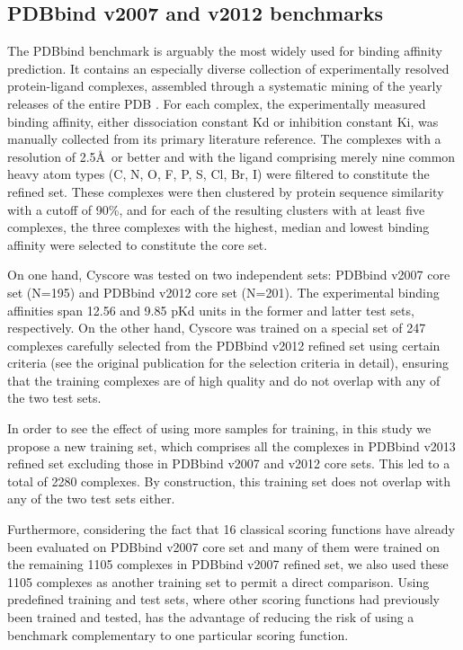 \documentclass[journal=jacsat,manuscript=article]{achemso}
\begin{document}
\subsection{PDBbind v2007 and v2012 benchmarks}

The PDBbind benchmark is arguably the most widely used for binding affinity prediction. It contains an especially diverse collection of experimentally resolved protein-ligand complexes, assembled through a systematic mining of the yearly releases of the entire PDB \cite{540,537}. For each complex, the experimentally measured binding affinity, either dissociation constant Kd or inhibition constant Ki, was manually collected from its primary literature reference. The complexes with a resolution of 2.5\AA\ or better and with the ligand comprising merely nine common heavy atom types (C, N, O, F, P, S, Cl, Br, I) were filtered to constitute the refined set. These complexes were then clustered by protein sequence similarity with a cutoff of 90\%, and for each of the resulting clusters with at least five complexes, the three complexes with the highest, median and lowest binding affinity were selected to constitute the core set.

On one hand, Cyscore was tested on two independent sets: PDBbind v2007 core set (N=195) and PDBbind v2012 core set (N=201). The experimental binding affinities span 12.56 and 9.85 pKd units in the former and latter test sets, respectively. On the other hand, Cyscore was trained on a special set of 247 complexes carefully selected from the PDBbind v2012 refined set using certain criteria (see the original publication \cite{1372} for the selection criteria in detail), ensuring that the training complexes are of high quality and do not overlap with any of the two test sets.

In order to see the effect of using more samples for training, in this study we propose a new training set, which comprises all the complexes in PDBbind v2013 refined set excluding those in PDBbind v2007 and v2012 core sets. This led to a total of 2280 complexes. By construction, this training set does not overlap with any of the two test sets either.

Furthermore, considering the fact that 16 classical scoring functions have already been evaluated \cite{1313} on PDBbind v2007 core set and many of them were trained on the remaining 1105 complexes in PDBbind v2007 refined set, we also used these 1105 complexes as another training set to permit a direct comparison. Using predefined training and test sets, where other scoring functions had previously been trained and tested, has the advantage of reducing the risk of using a benchmark complementary to one particular scoring function.
\end{document}

